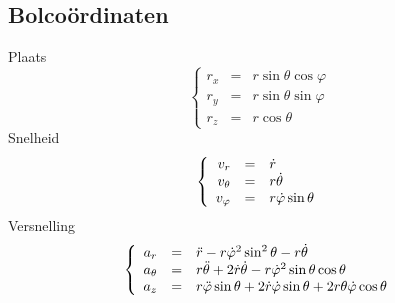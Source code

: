 \subsection{Bolcoördinaten}
\label{sec:BolCoords}
Plaats
\[
  \left\{
    \begin{array}{rcl}
      r_x & = & r \sin \theta \cos \varphi\\
      r_y & = & r \sin \theta \sin \varphi\\
      r_z & = & r \cos \theta
    \end{array}
  \right.
\]
Snelheid
\[
  \left\{
    \begin{array}{rcl}
      v_{r}       & = & \dot{r}\\
      v_{\theta}  & = & r \dot{\theta}\\
      v_{\varphi} & = & r \dot{\varphi} \sin \theta
    \end{array}
  \right.
\]
Versnelling
\[
  \left\{
    \begin{array}{rcl}
      a_{r}      & = & \ddot{r} - r \dot{\varphi}^2 \sin^2 \theta - r \dot{\theta}\\
      a_{\theta} & = & r \ddot{\theta} + 2 \dot{r}\dot{\theta} - r \dot{\varphi}^2 \sin \theta \cos \theta\\
      a_{z}      & = & r \ddot{\varphi} \sin \theta + 2 \dot{r}\dot{\varphi} \sin \theta + 2r \theta \dot{\varphi}\cos \theta 
    \end{array}
  \right.
\]

\onecolumn